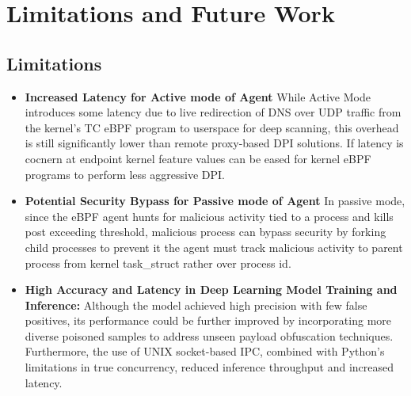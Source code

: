 \documentclass [11pt, proquest] {uwthesis}[2020/02/24]
\begin{document}
\section{Limitations and Future Work}

\subsection*{Limitations}

\begin{itemize}[nosep]

    \item \textbf{Increased Latency for Active mode of Agent}
     While Active Mode introduces some latency due to live redirection of DNS over UDP traffic from the kernel’s TC eBPF program to userspace for deep scanning, this overhead is still significantly lower than remote proxy-based DPI solutions. If latency is cocnern at endpoint kernel feature values can be eased for kernel eBPF programs to perform less aggressive DPI.

    \item \textbf{Potential Security Bypass for Passive mode of Agent}
    In passive mode, since the eBPF agent hunts for malicious activity tied to a process and kills post exceeding threshold, malicious process can bypass security by forking child processes to prevent it the agent must track malicious activity to parent process from kernel task\_struct rather over process id.

    \item \textbf{High Accuracy and Latency in Deep Learning Model Training and Inference:} Although the model achieved high precision with few false positives, its performance could be further improved by incorporating more diverse poisoned samples to address unseen payload obfuscation techniques. Furthermore, the use of UNIX socket-based IPC, combined with Python's limitations in true concurrency, reduced inference throughput and increased latency.


\end{itemize}
\end{document}
